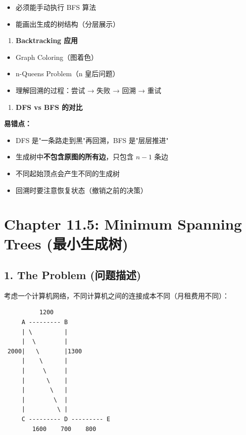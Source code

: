 \documentclass[10pt,a4paper,openany]{ctexbook}
\theoremstyle{definition}
\theoremstyle{remark}
\begin{document}
\begin{itemize}
\item 必须能手动执行 BFS 算法
\item 能画出生成的树结构（分层展示）

\end{itemize}

\begin{enumerate}
\item \textbf{Backtracking 应用}
\end{enumerate}

\begin{itemize}
\item Graph Coloring（图着色）
\item n-Queens Problem（n 皇后问题）
\item 理解回溯的过程：尝试 → 失败 → 回溯 → 重试

\end{itemize}

\begin{enumerate}
\item \textbf{DFS vs BFS 的对比}

\end{enumerate}

\textbf{易错点：}
\begin{itemize}
\item DFS 是"一条路走到黑"再回溯，BFS 是"层层推进"
\item 生成树中\textbf{不包含原图的所有边}，只包含 $n-1$ 条边
\item 不同起始顶点会产生不同的生成树
\item 回溯时要注意恢复状态（撤销之前的决策）

\end{itemize}


\section{Chapter 11.5: Minimum Spanning Trees (最小生成树)}

\vspace{-2pt}

\subsection{1. The Problem (问题描述)}

考虑一个计算机网络，不同计算机之间的连接成本不同（月租费用不同）：
{\footnotesize\begin{verbatim}
          1200
     A --------- B
     | \         |
     |  \        |
 2000|   \       |1300
     |    \      |
     |     \     |
     |      \    |
     |       \   |
     |        \  |
     |         \ |
     C --------- D --------- E
        1600    700    800
\end{verbatim}}
\end{document}
